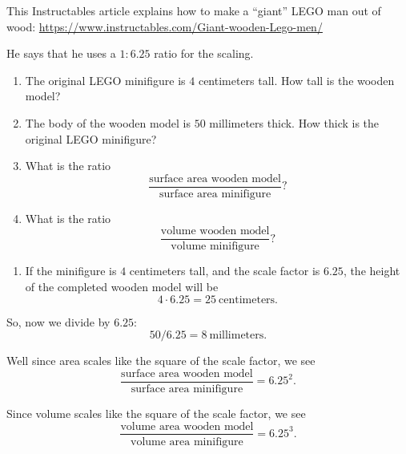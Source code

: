 \documentclass[handout,nooutcomes,noauthor,hints]{ximera}
\begin{document}
\mynewpage
\begin{question}
 This Instructables article explains how to make a ``giant'' LEGO man
 out of wood:
 \url{https://www.instructables.com/Giant-wooden-Lego-men/}
 
 He says that he uses a $1:6.25$ ratio for the scaling. 
 
\begin{enumerate}
 \item The original LEGO minifigure is $4$ centimeters tall. How tall is the
   wooden model?
 \item The body of the wooden model is $50$ millimeters thick. How
   thick is the original LEGO minifigure?
 \item What is the ratio
   \[
   \frac{\text{surface area wooden model}}{\text{surface area minifigure}}?
   \]
 \item What is the ratio
   \[
   \frac{\text{volume wooden model}}{\text{volume minifigure}}?
   \] 
 
\end{enumerate}

\begin{freeResponse}
  \begin{enumerate}
  \item If the minifigure is $4$ centimeters tall, and the scale factor is $6.25$, the height of the completed wooden model will be
    \[
    4\cdot 6.25 = 25~\text{centimeters}.
    \]
  \end{enumerate}
\item So, now we divide by $6.25$:
  \[
  50 / 6.25 = 8~\text{millimeters}.
  \]
\item Well since area scales like the square of the scale factor, we see
  \[
  \frac{\text{surface area wooden model}}{\text{surface area minifigure}} = 6.25^2.
  \]
\item Since volume scales like the square of the scale factor, we see
  \[
  \frac{\text{volume area wooden model}}{\text{volume area minifigure}} = 6.25^3.
  \]
\end{freeResponse}
\end{question}
\mynewpage
\end{document}
